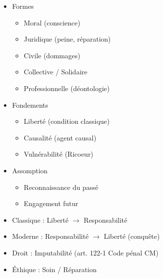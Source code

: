 \documentclass[11pt]{article}
\begin{document}
\begin{popfigure}
\begin{tcbraster}[raster columns=2,raster equal height=rows,raster column skip=6pt,raster row skip=6pt,enhanced,blankest]
\begin{tcolorbox}
\begin{itemize}[nosep,leftmargin=*,itemsep=1pt,font=\scriptsize]
\item Formes
\begin{itemize}[nosep,leftmargin=1.1em,itemsep=0pt]
\item Moral (conscience)
\item Juridique (peine, réparation)
\item Civile (dommages)
\item Collective / Solidaire
\item Professionnelle (déontologie)
\end{itemize}
\item Fondements
\begin{itemize}[nosep,leftmargin=1.1em,itemsep=0pt]
\item Liberté (condition classique)
\item Causalité (agent causal)
\item Vulnérabilité (Ricoeur)
\end{itemize}
\item Assomption
\begin{itemize}[nosep,leftmargin=1.1em,itemsep=0pt]
\item Reconnaissance du passé
\item Engagement futur
\end{itemize}
\end{itemize}
\end{tcolorbox}
\begin{tcolorbox}[enhanced,colback=white,colframe=poppurple!80!black,boxrule=0.9pt,arc=3pt,title={Lien Liberté $\leftrightarrow$ Responsabilité},fonttitle=\bfseries\scriptsize,coltitle=white,colbacktitle=poppurple!80!black,left=4pt,right=4pt,top=2pt,bottom=2pt,boxsep=1pt,toptitle=1.5pt,bottomtitle=1.5pt,halign=left]
\begin{itemize}[nosep,leftmargin=*,itemsep=1pt,font=\scriptsize]
\item Classique : Liberté $\rightarrow$ Responsabilité
\item Moderne : Responsabilité $\rightarrow$ Liberté (conquête)
\item Droit : Imputabilité (art. 122-1 Code pénal CM)
\item Éthique : Soin / Réparation
\end{itemize}
\end{tcolorbox}
\begin{tcolorbox}[enhanced,colback=white,colframe=poppink!80!black,boxrule=0.9pt,arc=3pt,title={Exemples Camerounais},fonttitle=\bfseries\scriptsize,coltitle=white,colbacktitle=poppink!80!black,left=4pt,right=4pt,top=2pt,bottom=2pt,boxsep=1pt,toptitle=1.5pt,bottomtitle=1.5pt,halign=left]

\end{tcolorbox}
\end{tcbraster}
\end{popfigure}
\end{document}
